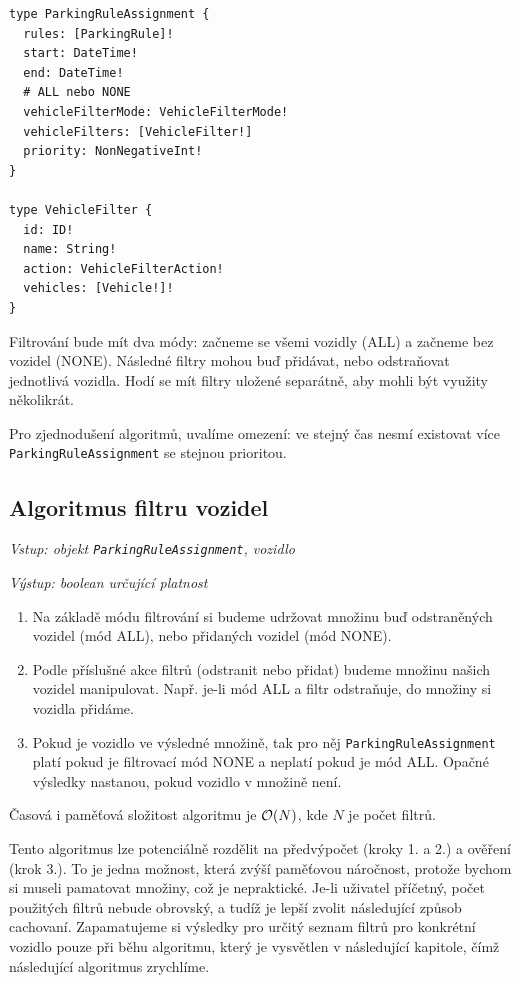\begin{lstlisting}
type ParkingRuleAssignment {
  rules: [ParkingRule]!
  start: DateTime!
  end: DateTime!
  # ALL nebo NONE
  vehicleFilterMode: VehicleFilterMode!
  vehicleFilters: [VehicleFilter!]
  priority: NonNegativeInt!
}

type VehicleFilter {
  id: ID!
  name: String!
  action: VehicleFilterAction!
  vehicles: [Vehicle!]!
}
\end{lstlisting}

Filtrování bude mít dva módy: začneme se všemi vozidly (ALL) a začneme bez vozidel (NONE).
Následné filtry mohou buď přidávat, nebo odstraňovat jednotlivá vozidla.
Hodí se mít filtry uložené separátně, aby mohli být využity několikrát.

Pro zjednodušení algoritmů, uvalíme omezení: ve stejný čas nesmí existovat více \texttt{ParkingRuleAssignment}
se stejnou prioritou.

\subsection{Algoritmus filtru vozidel}

\textit{Vstup: objekt \texttt{ParkingRuleAssignment}, vozidlo}

\textit{Výstup: boolean určující platnost}
\begin{enumerate}
  \setlength\itemsep{.05em}
  \item Na základě módu filtrování si budeme udržovat množinu buď odstraněných vozidel (mód ALL), nebo přidaných vozidel (mód NONE).
  \item Podle příslušné akce filtrů (odstranit nebo přidat) budeme množinu našich vozidel manipulovat. Např. je-li mód ALL a filtr odstraňuje, do množiny si vozidla přidáme.
  \item Pokud je vozidlo ve výsledné množině, tak pro něj \texttt{ParkingRuleAssignment} platí pokud je filtrovací mód NONE a neplatí pokud je mód ALL. Opačné výsledky nastanou, pokud vozidlo v množině není.
\end{enumerate}

Časová i paměťová složitost algoritmu je ${\cal O}(N)$, kde $N$ je počet filtrů.

Tento algoritmus lze potenciálně rozdělit na předvýpočet (kroky 1. a 2.) a ověření (krok 3.).
To je jedna možnost, která zvýší paměťovou náročnost, protože bychom si museli pamatovat množiny, což je nepraktické.
Je-li uživatel příčetný, počet použitých filtrů nebude obrovský, a tudíž je lepší zvolit následující způsob cachovaní.
Zapamatujeme si výsledky pro určitý seznam filtrů pro konkrétní vozidlo pouze při běhu algoritmu, který je
vysvětlen v následující kapitole, čímž následující algoritmus zrychlíme.

